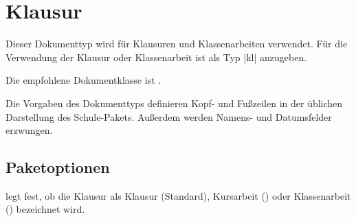 \section{Klausur}
\label{typ:kl}
Dieser Dokumenttyp wird für Klausuren und Klassenarbeiten verwendet. Für die Verwendung der Klausur oder Klassenarbeit ist als Typ \verbcode|kl| anzugeben.

Die empfohlene Dokumentklasse ist .

Die Vorgaben des Dokumenttyps definieren Kopf- und Fußzeilen in der üblichen Darstellung des Schule-Pakets. Außerdem werden Namens- und Datumsfelder erzwungen.

\subsection{Paketoptionen}
\begin{options}
        legt fest, ob die Klausur als Klausur (Standard), Kursarbeit () oder Klassenarbeit () bezeichnet wird.
\end{options}

%
%
